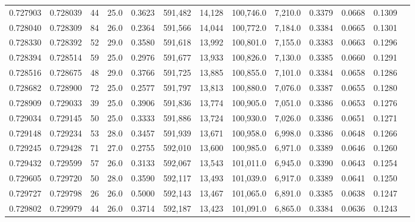 \begin{tabular}{rrrrrrrrrrrrr}
0.727903 & 0.728039 &    44 & 25.0 &                                     0.3623 & 591,482 &  14,128 & 100,746.0 &   7,210.0 & 0.3379 & 0.0668 & 0.1309 \\
0.728040 & 0.728309 &    84 & 26.0 &                                     0.2364 & 591,566 &  14,044 & 100,772.0 &   7,184.0 & 0.3384 & 0.0665 & 0.1301 \\
0.728330 & 0.728392 &    52 & 29.0 &                                     0.3580 & 591,618 &  13,992 & 100,801.0 &   7,155.0 & 0.3383 & 0.0663 & 0.1296 \\
0.728394 & 0.728514 &    59 & 25.0 &                                     0.2976 & 591,677 &  13,933 & 100,826.0 &   7,130.0 & 0.3385 & 0.0660 & 0.1291 \\
0.728516 & 0.728675 &    48 & 29.0 &                                     0.3766 & 591,725 &  13,885 & 100,855.0 &   7,101.0 & 0.3384 & 0.0658 & 0.1286 \\
0.728682 & 0.728900 &    72 & 25.0 &                                     0.2577 & 591,797 &  13,813 & 100,880.0 &   7,076.0 & 0.3387 & 0.0655 & 0.1280 \\
0.728909 & 0.729033 &    39 & 25.0 &                                     0.3906 & 591,836 &  13,774 & 100,905.0 &   7,051.0 & 0.3386 & 0.0653 & 0.1276 \\
0.729034 & 0.729145 &    50 & 25.0 &                                     0.3333 & 591,886 &  13,724 & 100,930.0 &   7,026.0 & 0.3386 & 0.0651 & 0.1271 \\
0.729148 & 0.729234 &    53 & 28.0 &                                     0.3457 & 591,939 &  13,671 & 100,958.0 &   6,998.0 & 0.3386 & 0.0648 & 0.1266 \\
0.729245 & 0.729428 &    71 & 27.0 &                                     0.2755 & 592,010 &  13,600 & 100,985.0 &   6,971.0 & 0.3389 & 0.0646 & 0.1260 \\
0.729432 & 0.729599 &    57 & 26.0 &                                     0.3133 & 592,067 &  13,543 & 101,011.0 &   6,945.0 & 0.3390 & 0.0643 & 0.1254 \\
0.729605 & 0.729720 &    50 & 28.0 &                                     0.3590 & 592,117 &  13,493 & 101,039.0 &   6,917.0 & 0.3389 & 0.0641 & 0.1250 \\
0.729727 & 0.729798 &    26 & 26.0 &                                     0.5000 & 592,143 &  13,467 & 101,065.0 &   6,891.0 & 0.3385 & 0.0638 & 0.1247 \\
0.729802 & 0.729979 &    44 & 26.0 &                                     0.3714 & 592,187 &  13,423 & 101,091.0 &   6,865.0 & 0.3384 & 0.0636 & 0.1243 \\

\end{tabular}
